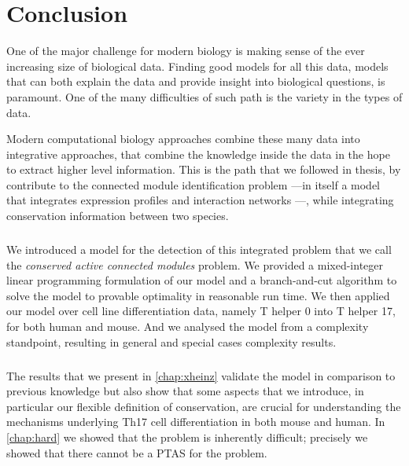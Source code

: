 \chapter{Conclusion}
\label{chap:concl}

One of the major challenge for modern biology is making sense of the ever increasing size of biological data.
Finding good models for all this data, models that can both explain the data and provide insight into biological questions, is paramount.
One of the many difficulties of such path is the variety in the types of data. %

Modern computational biology approaches combine these many data into integrative approaches, that combine the knowledge inside the data in the hope to extract higher level information.
This is the path that we followed in thesis, by contribute to the connected module identification problem ---in itself a model that integrates expression profiles and interaction networks ---, while integrating conservation information between two species.

\paragraph{}
We introduced a model for the detection of this integrated problem that we call the \emph{conserved active connected modules} problem.
We provided a mixed-integer linear programming formulation of our model and a branch-and-cut algorithm to solve the model to provable optimality in reasonable run time.
We then applied our model over cell line differentiation data, namely T helper 0 into T helper 17, for both human and mouse.
And we analysed the model from a complexity standpoint, resulting in general and special cases complexity results.

\paragraph{}
The results that we present in \cref{chap:xheinz} validate the model in comparison to previous knowledge but also show that some aspects that we introduce, in particular our flexible definition of conservation, are crucial for understanding the mechanisms underlying Th17 cell differentiation in both mouse and human.
In \cref{chap:hard} we showed that the problem is inherently difficult; precisely we showed that there cannot be a PTAS for the problem.

